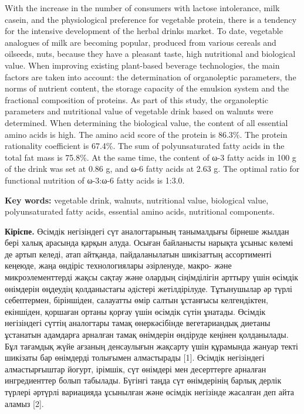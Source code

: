 With the increase in the number of consumers with lactose intolerance,
milk casein, and the physiological preference for vegetable protein,
there is a tendency for the intensive development of the herbal drinks
market. To date, vegetable analogues of milk are becoming popular,
produced from various cereals and oilseeds, nuts, because they have a
pleasant taste, high nutritional and biological value. When improving
existing plant-based beverage technologies, the main factors are taken
into account: the determination of organoleptic parameters, the norms of
nutrient content, the storage capacity of the emulsion system and the
fractional composition of proteins. As part of this study, the
organoleptic parameters and nutritional value of vegetable drink based
on walnuts were determined. When determining the biological value, the
content of all essential amino acids is high. The amino acid score of
the protein is 86.3\%. The protein rationality coefficient is 67.4\%.
The sum of polyunsaturated fatty acids in the total fat mass is 75.8\%.
At the same time, the content of ω-3 fatty acids in 100 g of the drink
was set at 0.86 g, and ω-6 fatty acids at 2.63 g. The optimal ratio for
functional nutrition of ω-3:ω-6 fatty acids is 1:3.0.

{\bfseries Key words:} vegetable drink, walnuts, nutritional value,
biological value, polyunsaturated fatty acids, essential amino acids,
nutritional components.

{\bfseries Кіріспе.} Өсімдік негізіндегі сүт аналогтарының танымалдығы
бірнеше жылдан бері халық арасында қарқын алуда. Осыған байланысты
нарықта ұсыныс көлемі де артып келеді, атап айтқанда, пайдаланылатын
шикізаттың ассортименті кеңеюде, жаңа өндіріс технологиялары әзірленуде,
макро- және микроэлементтерді жақсы сақтау және олардың сіңімділігін
арттыру үшін өсімдік өнімдерін өңдеудің қолданыстағы әдістері
жетілдірілуде. Тұтынушылар әр түрлі себептермен, біріншіден, салауатты
өмір салтын ұстанғысы келгендіктен, екіншіден, қоршаған ортаны қорғау
үшін өсімдік сүтін ұнатады. Өсімдік негізіндегі сүттің аналогтары тамақ
өнеркәсібінде вегетариандық диетаны ұстанатын адамдарға арналған тамақ
өнімдерін өндіруде кеңінен қолданылады. Бұл тағамдық жүйе ағзаның
денсаулығын жақсарту үшін құрамында жануар текті шикізаты бар өнімдерді
толығымен алмастырады {[}1{]}. Өсімдік негізіндегі алмастырғыштар
йогурт, ірімшік, сүт өнімдері мен десерттерге арналған ингредиенттер
болып табылады. Бүгінгі таңда сүт өнімдерінің барлық дерлік түрлері
әртүрлі вариацияда ұсынылған және өсімдік негізінде жасалған деп айта
аламыз {[}2{]}.

